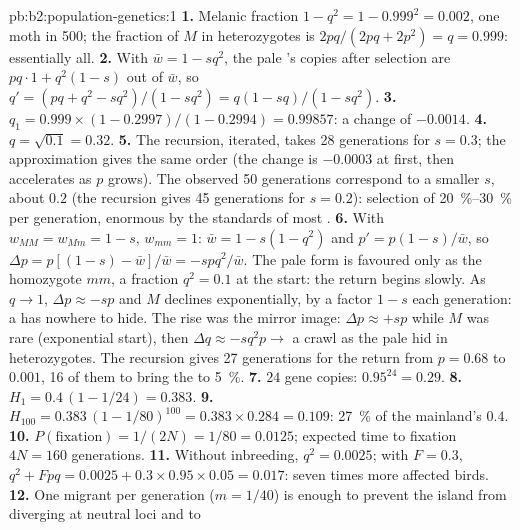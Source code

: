 \begin{solution}{pb:b2:population-genetics:1}
\textbf{1.} Melanic fraction $1 - q^{2} = 1 - 0.999^{2} = 0.002$,
one moth in 500; the fraction of $M$  in heterozygotes is
$2pq/(2pq + 2p^{2}) = q = 0.999$: essentially all.
\textbf{2.} With $\bar w = 1 - sq^{2}$, the pale 's copies
after selection are $pq\cdot 1 + q^{2}(1 - s)$ out of $\bar w$, so $q'
= (pq + q^{2} - sq^{2})/(1 - sq^{2}) = q(1 - sq)/(1 - sq^{2})$.
\textbf{3.} $q_1 = 0.999\times(1 - 0.2997)/(1 - 0.2994) = 0.99857$:
a change of $-0.0014$.
\textbf{4.} $q = \sqrt{0.1} = 0.32$.
\textbf{5.} The recursion, iterated, takes 28 generations for $s =
0.3$; the approximation gives the same order (the change is
$-0.0003$ at first, then accelerates as $p$ grows). The observed 50
generations correspond to a smaller $s$, about $0.2$ (the recursion
gives 45 generations for $s = 0.2$): selection of \qtyrange{20}{30}{\%}
per generation, enormous by the standards of most .
\textbf{6.} With $w_{MM} = w_{Mm} = 1 - s$, $w_{mm} = 1$: $\bar w = 1
- s(1 - q^{2})$ and $p' = p(1 - s)/\bar w$, so $\Delta p = p[(1 - s) -
\bar w]/\bar w = -spq^{2}/\bar w$. The pale form is favoured only as
the homozygote $mm$, a fraction $q^{2} = 0.1$ at the start: the
return begins slowly. As $q \to 1$, $\Delta p \approx -sp$ and $M$
declines exponentially, by a factor $1 - s$ each generation: a
  has nowhere to hide. The rise was the mirror image:
$\Delta p \approx +sp$ while $M$ was rare (exponential start), then
$\Delta q \approx -sq^{2}p \to$ a crawl as the pale  hid in
heterozygotes. The recursion gives 27 generations for the return
from $p = 0.68$ to $0.001$, 16 of them to bring the  to \qty{5}{\%}.
\textbf{7.} $24$ gene copies: $0.95^{24} = 0.29$.
\textbf{8.} $H_1 = 0.4\,(1 - 1/24) = 0.383$.
\textbf{9.} $H_{100} = 0.383\,(1 - 1/80)^{100} = 0.383\times 0.284 =
0.109$: \qty{27}{\%} of the mainland's $0.4$.
\textbf{10.} $P(\text{fixation}) = 1/(2N) = 1/80 = 0.0125$; expected
time to fixation $4N = 160$ generations.
\textbf{11.} Without inbreeding, $q^{2} = 0.0025$; with $F = 0.3$,
$q^{2} + Fpq = 0.0025 + 0.3\times 0.95\times 0.05 = 0.017$: seven
times more affected birds.
\textbf{12.} One migrant per generation ($m = 1/40$) is enough to
prevent the island from diverging at neutral loci and to

\end{solution}
